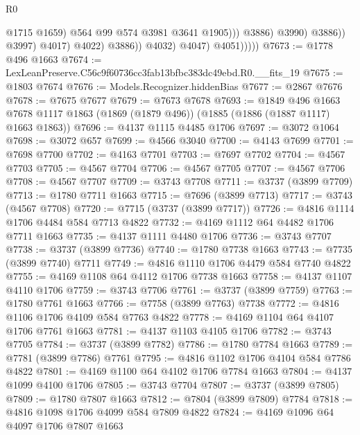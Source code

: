 \begin{lexlean}{R0}
\begin{coremodule}
                                            @1715
                                            @1659)
                                          @564
                                          @99
                                          @574
                                          @3981
                                          @3641
                                          @1905)))
                                    @3886)
                                  @3990)
                                @3886))
                            @3997)
                          @4017)
                        @4022)
                      @3886))
                  @4032)
                @4047)
              @4051)))))
@7673 := @1778 @496 @1663
@7674 := LexLeanPreserve.C56c9f60736cc3fab13bfbc383dc49ebd.R0.__fits_19
@7675 := @1803 @7674
@7676 := Models.Recognizer.hiddenBias
@7677 := @2867 @7676
@7678 := @7675 @7677
@7679 := @7673 @7678
@7693 := @1849
    @496
    @1663
    @7678
    @1117
    @1863
    (@1869 (@1879 @496))
    (@1885 (@1886 (@1887 @1117) @1663 @1863))
@7696 := @4137 @1115 @4485 @1706
@7697 := @3072 @1064
@7698 := @3072 @657
@7699 := @4566 @3040
@7700 := @4143 @7699
@7701 := @7698 @7700
@7702 := @4163 @7701
@7703 := @7697 @7702
@7704 := @4567 @7703
@7705 := @4567 @7704
@7706 := @4567 @7705
@7707 := @4567 @7706
@7708 := @4567 @7707
@7709 := @3743 @7708
@7711 := @3737 (@3899 @7709)
@7713 := @1780 @7711 @1663
@7715 := @7696 (@3899 @7713)
@7717 := @3743 (@4567 @7708)
@7720 := @7715 (@3737 (@3899 @7717))
@7726 := @4816 @1114 @1706 @4484 @584 @7713 @4822
@7732 := @4169 @1112 @64 @4482 @1706 @7711 @1663
@7735 := @4137 @1111 @4480 @1706
@7736 := @3743 @7707
@7738 := @3737 (@3899 @7736)
@7740 := @1780 @7738 @1663
@7743 := @7735 (@3899 @7740) @7711
@7749 := @4816 @1110 @1706 @4479 @584 @7740 @4822
@7755 := @4169 @1108 @64 @4112 @1706 @7738 @1663
@7758 := @4137 @1107 @4110 @1706
@7759 := @3743 @7706
@7761 := @3737 (@3899 @7759)
@7763 := @1780 @7761 @1663
@7766 := @7758 (@3899 @7763) @7738
@7772 := @4816 @1106 @1706 @4109 @584 @7763 @4822
@7778 := @4169 @1104 @64 @4107 @1706 @7761 @1663
@7781 := @4137 @1103 @4105 @1706
@7782 := @3743 @7705
@7784 := @3737 (@3899 @7782)
@7786 := @1780 @7784 @1663
@7789 := @7781 (@3899 @7786) @7761
@7795 := @4816 @1102 @1706 @4104 @584 @7786 @4822
@7801 := @4169 @1100 @64 @4102 @1706 @7784 @1663
@7804 := @4137 @1099 @4100 @1706
@7805 := @3743 @7704
@7807 := @3737 (@3899 @7805)
@7809 := @1780 @7807 @1663
@7812 := @7804 (@3899 @7809) @7784
@7818 := @4816 @1098 @1706 @4099 @584 @7809 @4822
@7824 := @4169 @1096 @64 @4097 @1706 @7807 @1663

\end{coremodule}
\end{lexlean}
